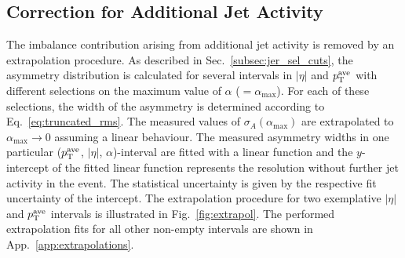 \subsection{Correction for Additional Jet Activity}
\label{subsec:jer_corrections_alpha}
The imbalance contribution arising from additional jet activity is removed by an extrapolation procedure. As described in Sec.~\ref{subsec:jer_sel_cuts}, the asymmetry distribution is calculated for several intervals in $|\eta|$ and $p_{\text{T}}^\mathrm{ave}$ with different selections on the maximum value of $\alpha$ ($=\alpha_\mathrm{max}$). For each of these selections, the width of the asymmetry is determined according to Eq.~\ref{eq:truncated_rms}. The measured values of $\sigma_{A}(\alpha_\mathrm{max})$ are extrapolated to $\alpha_\mathrm{max} \rightarrow 0$ assuming a linear behaviour. The measured asymmetry widths in one particular ($p_{\text{T}}^\mathrm{ave}$, $|\eta|$, $\alpha$)-interval are fitted with a linear function and the $y$-intercept of the fitted linear function represents the resolution without further jet activity in the event. The statistical uncertainty is given by the respective fit uncertainty of the intercept. The extrapolation procedure for two exemplative $|\eta|$ and $p_{\text{T}}^\mathrm{ave}$ intervals is illustrated in Fig.~\ref{fig:extrapol}. The performed extrapolation fits for all other non-empty intervals are shown in App.~\ref{app:extrapolations}. 
